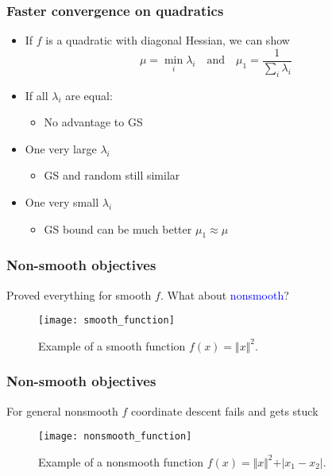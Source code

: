 \documentclass[aspectratio=149]{beamer}
\begin{document}
\begin{frame}
  \frametitle{Faster convergence on quadratics}
  \begin{itemize}
    \item If $f$ is a quadratic with diagonal Hessian, we can show
          \begin{equation}
            \mu = \min_i \lambda_i \quad \text{and} \quad \mu_1 = \frac{1}{\sum_{i}^{} \lambda_i}
          \end{equation}
    \item If all $\lambda_i$ are equal:
          \begin{itemize}
            \item No advantage to GS
          \end{itemize}
    \item One very large $\lambda_i$
          \begin{itemize}
            \item GS and random still similar
          \end{itemize}
    \item One very small $\lambda_i$
          \begin{itemize}
            \item GS bound can be much better $\mu_1 \approx \mu$
          \end{itemize}
  \end{itemize}

\end{frame}


\begin{frame}
  \frametitle{Non-smooth objectives}
  Proved everything for smooth $f$. What about \textcolor{blue}{nonsmooth}?
  \begin{figure}[ht]
    \centering
    \texttt{[image: smooth\_function]}
    \caption{Example of a smooth function $f(x)= \Vert x \Vert^2$.}
  \end{figure}
\end{frame}


\begin{frame}
  \frametitle{Non-smooth objectives}
  For general nonsmooth $f$ coordinate descent fails and gets stuck
  \begin{figure}[ht]
    \centering
    \texttt{[image: nonsmooth\_function]}
    \caption{Example of a nonsmooth function $f(x)= \Vert x \Vert^2 + \vert x_1 - x_2 \vert$.}
  \end{figure}
\end{frame}
\end{document}
